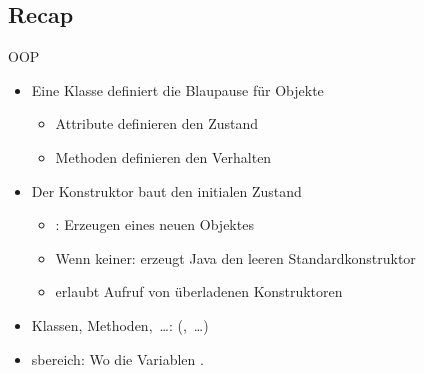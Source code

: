 \subsection{Recap}
\begin{frame}[c]{\hfill OOP}
\begin{itemize}[<+(1)->]
   \itemsep18pt
   \item Eine Klasse definiert die Blaupause für Objekte \begin{itemize}
      \item Attribute definieren den Zustand
      \item Methoden definieren den Verhalten
   \end{itemize}
   \item Der Konstruktor baut den initialen Zustand \begin{itemize}
      \item {}: Erzeugen eines neuen Objektes
      \item Wenn keiner: erzeugt Java den leeren Standardkonstruktor
      \item {} erlaubt Aufruf von überladenen Konstruktoren
   \end{itemize}
   \item Klassen, Methoden,~\ldots:\hfill {}  (,~\ldots)
   \item {}sbereich: Wo die Variablen .
\end{itemize}
\LargeSide
\end{frame}


